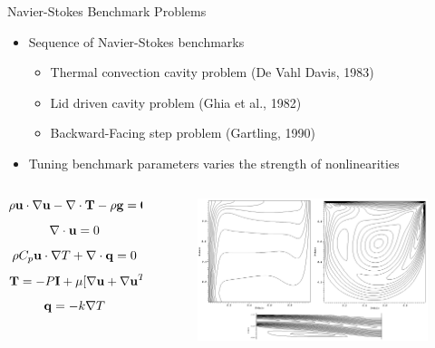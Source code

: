 \documentclass{beamer}
\begin{document}
\begin{frame}{Navier-Stokes Benchmark Problems}

  \begin{itemize}
  \item Sequence of Navier-Stokes benchmarks
    \begin{itemize}
    \item Thermal convection cavity problem (De Vahl Davis, 1983)
    \item Lid driven cavity problem (Ghia et al., 1982)
    \item Backward-Facing step problem (Gartling, 1990)
    \end{itemize}
    \medskip
  \item Tuning benchmark parameters varies the strength of
    nonlinearities
  \end{itemize}

  \begin{columns}
    \begin{column}{0.4\textwidth}
      {\small
      \[
      \rho \mathbf{u} \cdot \nabla \mathbf{u} - \nabla \cdot \mathbf{T} - \rho
      \mathbf{g} = \mathbf{0}
      \]
      \[
      \nabla \cdot \mathbf{u} = 0
      \]
      \[
      \rho C_p \mathbf{u} \cdot \nabla T + \nabla \cdot \mathbf{q} = 0
      \]
      \[
      \mathbf{T} = -P \mathbf{I} + \mu[\nabla \mathbf{u} + \nabla \mathbf{u}^T]
      \]
      \[
      \mathbf{q} = - k \nabla T
      \]
      }
    \end{column}

    \begin{column}{0.6\textwidth}

      \begin{figure}[htpb!]
        \begin{center}
          \includegraphics[width=2.9in]{benchmark_solutions.png}
        \end{center}
      \end{figure}

    \end{column}
  \end{columns}

\end{frame}
\end{document}
